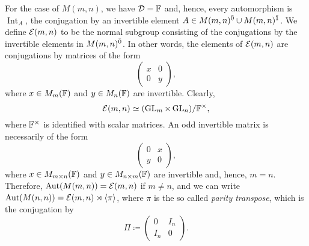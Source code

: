 For the case of $M(m,n)$, we have $\mathcal{D} = \mathbb{F}$ and, hence, every automorphism is $\operatorname{Int}_A$, the conjugation by an invertible element $A \in M(m,n)^{\bar0} \cup M(m,n)^{\bar1}$. 
We define $\mathcal E (m,n)$ to be the normal subgroup consisting of the conjugations by the invertible elements in $M(m,n)^{\bar0}$. 
In other words, the elements of $\mathcal E (m,n)$ are conjugations by matrices of the form
\[\label{eq:mc-E(m-n)-is-conjugation}
\begin{pmatrix}
    x & 0\\
    0 & y
\end{pmatrix},
\]
where $x \in M_{m}(\mathbb{F})$ and $y\in M_n(\mathbb{F})$ are invertible. 
Clearly, \[
    \mathcal E(m,n) \simeq (\operatorname{GL}_m \times \operatorname{GL}_n) / \mathbb{F}^\times,
\]
where $\mathbb{F}^\times$ is identified with scalar matrices.
An odd invertible matrix is necessarily of the form 
\[
\begin{pmatrix}
    0 & x\\
    y & 0
\end{pmatrix},
\]
where $x \in M_{m\times n} (\mathbb{F})$ and $y \in M_{n\times m} (\mathbb{F})$ are invertible and, hence, $m = n$. 
Therefore, $\operatorname{Aut}( M(m,n)) = \mathcal E (m,n)$ if $m \neq n$, and we can write $\operatorname{Aut}(M(n,n)) = \mathcal E (m,n) \rtimes \langle \pi \rangle$, where $\pi$ is the so called \emph{parity transpose}, which is the conjugation by 
\[\label{eq:pi-is-conjugation-by}
    \Pi \coloneqq \begin{pmatrix}
    0 & I_n\\
    I_n & 0
\end{pmatrix}.
\]


